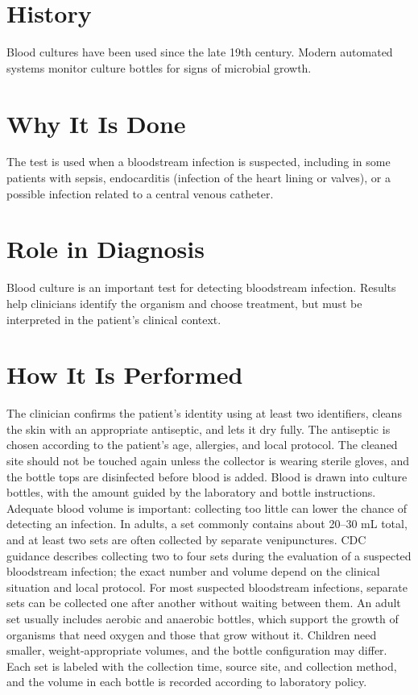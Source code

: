 \section*{History}
Blood cultures have been used since the late 19th century. Modern automated systems monitor culture bottles for signs of microbial growth.

\section*{Why It Is Done}
The test is used when a bloodstream infection is suspected, including in some patients with sepsis, endocarditis (infection of the heart lining or valves), or a possible infection related to a central venous catheter.

\section*{Role in Diagnosis}
Blood culture is an important test for detecting bloodstream infection. Results help clinicians identify the organism and choose treatment, but must be interpreted in the patient's clinical context.

\section*{How It Is Performed}
The clinician confirms the patient's identity using at least two identifiers, cleans the skin with an appropriate antiseptic, and lets it dry fully. The antiseptic is chosen according to the patient's age, allergies, and local protocol. The cleaned site should not be touched again unless the collector is wearing sterile gloves, and the bottle tops are disinfected before blood is added. Blood is drawn into culture bottles, with the amount guided by the laboratory and bottle instructions. Adequate blood volume is important: collecting too little can lower the chance of detecting an infection. In adults, a set commonly contains about 20--30 mL total, and at least two sets are often collected by separate venipunctures. CDC guidance describes collecting two to four sets during the evaluation of a suspected bloodstream infection; the exact number and volume depend on the clinical situation and local protocol. For most suspected bloodstream infections, separate sets can be collected one after another without waiting between them. An adult set usually includes aerobic and anaerobic bottles, which support the growth of organisms that need oxygen and those that grow without it. Children need smaller, weight-appropriate volumes, and the bottle configuration may differ. Each set is labeled with the collection time, source site, and collection method, and the volume in each bottle is recorded according to laboratory policy.

